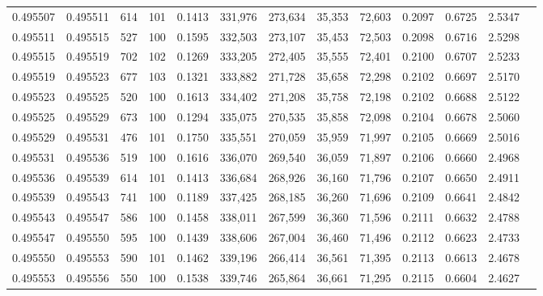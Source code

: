 \begin{tabular}{rrrrrrrrrrrrr}
0.495507 & 0.495511 &   614 & 101 &                                     0.1413 & 331,976 & 273,634 &  35,353 &  72,603 & 0.2097 & 0.6725 & 2.5347 \\
0.495511 & 0.495515 &   527 & 100 &                                     0.1595 & 332,503 & 273,107 &  35,453 &  72,503 & 0.2098 & 0.6716 & 2.5298 \\
0.495515 & 0.495519 &   702 & 102 &                                     0.1269 & 333,205 & 272,405 &  35,555 &  72,401 & 0.2100 & 0.6707 & 2.5233 \\
0.495519 & 0.495523 &   677 & 103 &                                     0.1321 & 333,882 & 271,728 &  35,658 &  72,298 & 0.2102 & 0.6697 & 2.5170 \\
0.495523 & 0.495525 &   520 & 100 &                                     0.1613 & 334,402 & 271,208 &  35,758 &  72,198 & 0.2102 & 0.6688 & 2.5122 \\
0.495525 & 0.495529 &   673 & 100 &                                     0.1294 & 335,075 & 270,535 &  35,858 &  72,098 & 0.2104 & 0.6678 & 2.5060 \\
0.495529 & 0.495531 &   476 & 101 &                                     0.1750 & 335,551 & 270,059 &  35,959 &  71,997 & 0.2105 & 0.6669 & 2.5016 \\
0.495531 & 0.495536 &   519 & 100 &                                     0.1616 & 336,070 & 269,540 &  36,059 &  71,897 & 0.2106 & 0.6660 & 2.4968 \\
0.495536 & 0.495539 &   614 & 101 &                                     0.1413 & 336,684 & 268,926 &  36,160 &  71,796 & 0.2107 & 0.6650 & 2.4911 \\
0.495539 & 0.495543 &   741 & 100 &                                     0.1189 & 337,425 & 268,185 &  36,260 &  71,696 & 0.2109 & 0.6641 & 2.4842 \\
0.495543 & 0.495547 &   586 & 100 &                                     0.1458 & 338,011 & 267,599 &  36,360 &  71,596 & 0.2111 & 0.6632 & 2.4788 \\
0.495547 & 0.495550 &   595 & 100 &                                     0.1439 & 338,606 & 267,004 &  36,460 &  71,496 & 0.2112 & 0.6623 & 2.4733 \\
0.495550 & 0.495553 &   590 & 101 &                                     0.1462 & 339,196 & 266,414 &  36,561 &  71,395 & 0.2113 & 0.6613 & 2.4678 \\
0.495553 & 0.495556 &   550 & 100 &                                     0.1538 & 339,746 & 265,864 &  36,661 &  71,295 & 0.2115 & 0.6604 & 2.4627 \\

\end{tabular}
